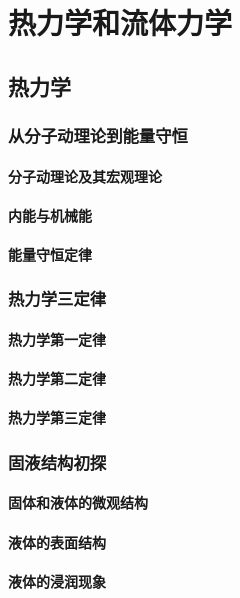 \chapter{热力学和流体力学}
\section{热力学}
\subsection{从分子动理论到能量守恒}
\subsubsection{分子动理论及其宏观理论}
\subsubsection{内能与机械能}
\subsubsection{能量守恒定律}

\subsection{热力学三定律}
\subsubsection{热力学第一定律}
\subsubsection{热力学第二定律}
\subsubsection{热力学第三定律}

\subsection{固液结构初探}
\subsubsection{固体和液体的微观结构}
\subsubsection{液体的表面结构}
\subsubsection{液体的浸润现象}


